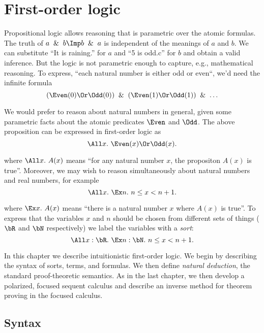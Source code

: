 
\chapter{First-order logic}

Propositional logic allows reasoning that is parametric over the atomic formulas.
The truth of $a\And b\Imp b\And a$ is independent of the meanings of
$a$ and $b$.  We can substitute ``It is raining.'' for $a$ and ``5 is odd.c''
for $b$ and obtain a valid inference.  But the logic is not parametric
enough to capture, e.g., mathematical reasoning.  To express,
``each natural number is either odd or even``, we'd need
the infinite formula
\[ (\Even(0)\Or\Odd(0))\And(\Even(1)\Or\Odd(1))\And\ldots \]

\noindent
We would prefer to reason about natural numbers in general, given some
parametric facts about the atomic predicates $\Even$ and $\Odd$.
The above proposition can be expressed in first-order logic as
\[ \All x.~\Even(x)\Or\Odd(x). \]

\noindent
where $\All x.~A(x)$ means ``for any natural number $x$, the propositon
$A(x)$ is true''.  Moreover, we may wish to reason simultaneously about natural numbers and
real numbers, for example
\[ \All x.~\Ex n.~n\le x< n+1. \]

\noindent
where $\Ex x.~A(x)$ means ``there is a natural number $x$ where $A(x)$ is true''.
To express that the variables $x$ and $n$ should be chosen from different sets
of things ($\bR$ and $\bN$ respectively) we label the variables with
a \emph{sort}:
\[ \All x : \bR.~\Ex n : \bN.~n\le x< n+1. \]

\noindent
In this chapter we describe intuitionistic first-order logic.  We begin
by describing the syntax of sorts, terms, and formulas.  We then
define \emph{natural deduction}, the standard proof-theoretic semantics.
As in the last chapter, we then develop a polarized, focused sequent calculus
and describe an inverse method for theorem proving in the focused calculus.

\section{Syntax}

